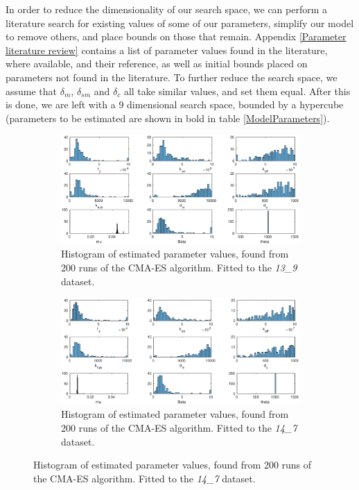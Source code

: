 \documentclass[10pt,journal]{./IEEE_latex_class/IEEEtran}
\begin{document}
In order to reduce the dimensionality of our search space, we can perform a literature search for existing values of some of our parameters, simplify our model to remove others, and place bounds on those that remain. Appendix \ref{Parameter literature review} contains a list of parameter values found in the literature, where available, and their reference, as well as initial bounds placed on parameters not found in the literature. To further reduce the search space, we assume that $\delta_m$, $\delta_{sm}$ and $\delta_c$ all take similar values, and set them equal. After this is done, we are left with a 9 dimensional search space, bounded by a hypercube (parameters to be estimated are shown in bold in table \ref{ModelParameters}).

 
\begin{figure}
    \begin{subfigure}[h]{0.49\textwidth}
    \centering
        \includegraphics[scale = 0.38, clip = true, trim = 80 0 74 0]{13_9_hist.eps}
        \caption{Histogram of estimated parameter values, found from 200 runs of the CMA-ES algorithm. Fitted to the \textit{13\_9} dataset.}
    \end{subfigure}
    \begin{subfigure}[c]{0.49\textwidth}
    \centering
        \includegraphics[scale = 0.38,clip = true, trim = 60 12 74 0]{14_7_hist.eps}
        \caption{Histogram of estimated parameter values, found from 200 runs of the CMA-ES algorithm. Fitted to the \textit{14\_7} dataset. }
    \end{subfigure}


\end{figure}
\end{document}
